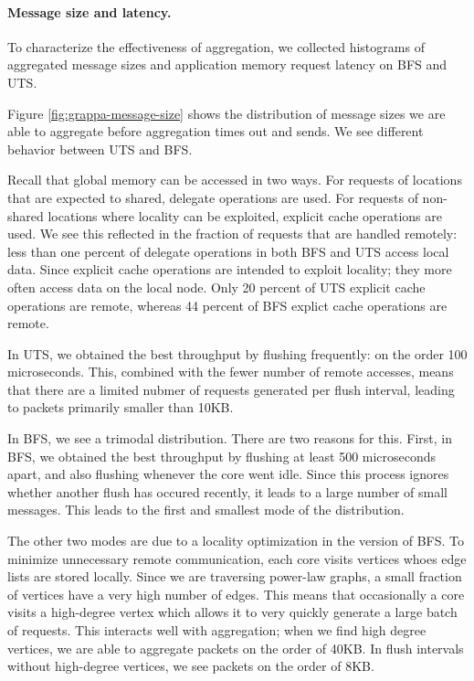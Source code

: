 \paragraph{Message size and latency.}

To characterize the effectiveness of aggregation, we collected
histograms of aggregated message sizes and application memory request
latency on BFS and UTS. 

Figure \ref{fig:grappa-message-size} shows the distribution of message
sizes we are able to aggregate before aggregation times out and
sends. We see different behavior between UTS and BFS. 

Recall that global memory can be accessed in two ways. For requests of
locations that are expected to shared, delegate operations are
used. For requests of non-shared locations where locality can be
exploited, explicit cache operations are used. We see this reflected
in the fraction of requests that are handled remotely: less than one
percent of delegate operations in both BFS and UTS access local
data. Since explicit cache operations are intended to exploit
locality; they more often access data on the local node. Only 20
percent of UTS explicit cache operations are remote, whereas 44
percent of BFS explict cache operations are remote.

In UTS, we obtained the best throughput by flushing frequently: on the
order 100 microseconds. This, combined with the fewer number of remote
accesses, means that there are a limited nubmer of requests generated
per flush interval, leading to packets primarily smaller than 10KB.

In BFS, we see a trimodal distribution. There are two reasons for
this. First, in BFS, we obtained the best throughput by flushing at
least 500 microseconds apart, and also flushing whenever the core went
idle. Since this process ignores whether another flush has occured
recently, it leads to a large number of small messages. This leads to
the first and smallest mode of the distribution.

The other two modes are due to a locality optimization in the \Grappa
version of BFS. To minimize unnecessary remote communication, each
core visits vertices whoes edge lists are stored locally. Since we are
traversing power-law graphs, a small fraction of vertices have a very
high number of edges. This means that occasionally a core visits a
high-degree vertex which allows it to very quickly generate a large
batch of requests. This interacts well with aggregation; when we find
high degree vertices, we are able to aggregate packets on the order of
40KB. In flush intervals without high-degree vertices, we see packets
on the order of 8KB.

